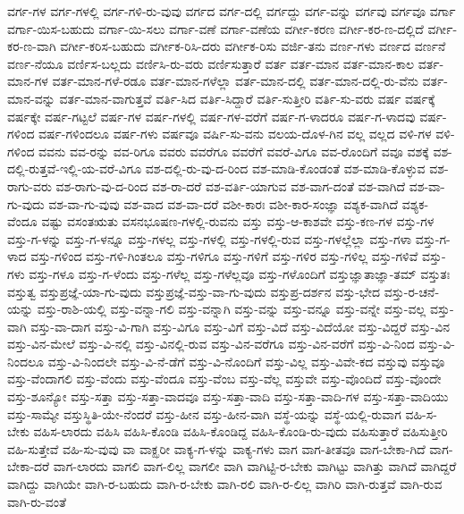 {ವರ್ಗ-ಗಳ
ವರ್ಗ-ಗಳಲ್ಲಿ
ವರ್ಗ-ಗಳಿ-ರು-ವುವು
ವರ್ಗದ
ವರ್ಗ-ದಲ್ಲಿ
ವರ್ಗದ್ದು
ವರ್ಗ-ವನ್ನು
ವರ್ಗವು
ವರ್ಗವೂ
ವರ್ಗಾ
ವರ್ಗಾ-ಯಿಸ-ಬಹುದು
ವರ್ಗಾ-ಯಿ-ಸಲು
ವರ್ಗಾ-ವಣೆ
ವರ್ಗಾ-ವಣೆಯ
ವರ್ಗೀ-ಕರಣ
ವರ್ಗೀ-ಕರ-ಣ-ದಲ್ಲಿದೆ
ವರ್ಗೀ-ಕರ-ಣ-ವಾಗಿ
ವರ್ಗೀ-ಕರಿಸ-ಬಹುದು
ವರ್ಗೀಕ-ರಿಸಿ-ದರು
ವರ್ಗೀಕ-ರಿಸು
ವರ್ಜಿ-ತನು
ವರ್ಣ-ಗಳು
ವರ್ಣದ
ವರ್ಣನೆ
ವರ್ಣ-ನೆಯೂ
ವರ್ಣಿಸ-ಬಲ್ಲದು
ವರ್ಣಿಸಿ-ರು-ವರು
ವರ್ಣಿಸುತ್ತಾರೆ
ವರ್ತ
ವರ್ತ-ಮಾನ
ವರ್ತ-ಮಾನ-ಕಾಲ
ವರ್ತ-ಮಾನ-ಗಳ
ವರ್ತ-ಮಾನ-ಗಳೆ-ರಡೂ
ವರ್ತ-ಮಾನ-ಗಳೆಲ್ಲಾ
ವರ್ತ-ಮಾನ-ದಲ್ಲಿ
ವರ್ತ-ಮಾನ-ದಲ್ಲಿ-ರು-ವೆನು
ವರ್ತ-ಮಾನ-ವನ್ನು
ವರ್ತ-ಮಾನ-ವಾಗುತ್ತವೆ
ವರ್ತಿ-ಸಿದ
ವರ್ತಿ-ಸಿದ್ದಾರೆ
ವರ್ತಿ-ಸುತ್ತೀರಿ
ವರ್ತಿ-ಸು-ವರು
ವರ್ಷ
ವರ್ಷಕ್ಕೆ
ವರ್ಷಕ್ಕೇ
ವರ್ಷ-ಗಟ್ಟಲೆ
ವರ್ಷ-ಗಳ
ವರ್ಷ-ಗಳಲ್ಲಿ
ವರ್ಷ-ಗಳ-ವರೆಗೆ
ವರ್ಷ-ಗ-ಳಾದರೂ
ವರ್ಷ-ಗ-ಳಾದವು
ವರ್ಷ-ಗಳಿಂದ
ವರ್ಷ-ಗಳಿಂದಲೂ
ವರ್ಷ-ಗಳು
ವರ್ಷವೂ
ವರ್ಷಿ-ಸು-ವನು
ವಲಯ-ದೊಳ-ಗಿನ
ವಲ್ಲ
ವಲ್ಲದ
ವಳಿ-ಗಳ
ವಳಿ-ಗಳಿಂದ
ವವನು
ವವ-ರನ್ನು
ವವ-ರಿಗೂ
ವವರು
ವವರೆಗೂ
ವವರೆಗೆ
ವವರೆ-ವಿಗೂ
ವವ-ರೊಂದಿಗೆ
ವವೂ
ವಶಕ್ಕೆ
ವಶ-ದಲ್ಲಿ-ರುತ್ತವೆ-ಇಲ್ಲಿ-ಯ-ವರೆ-ವಿಗೂ
ವಶ-ದಲ್ಲಿ-ರು-ವು-ದ-ರಿಂದ
ವಶ-ಮಾಡಿ-ಕೊಂಡಂತೆ
ವಶ-ಮಾಡಿ-ಕೊಳ್ಳುವ
ವಶ-ರಾಗು-ವರು
ವಶ-ರಾಗು-ವು-ದ-ರಿಂದ
ವಶ-ರಾ-ದರೆ
ವಶ-ವರ್ತಿ-ಯಾಗುವ
ವಶ-ವಾಗ-ದಂತೆ
ವಶ-ವಾಗಿದೆ
ವಶ-ವಾ-ಗು-ವುದು
ವಶ-ವಾ-ಗು-ವುವು
ವಶ-ವಾದ
ವಶ-ವಾ-ದರೆ
ವಶೀ-ಕಾರಃ
ವಶೀ-ಕಾರ-ಸಂಜ್ಞಾ
ವಶ್ಯಕ-ವಾಗಿದೆ
ವಶ್ಯಕ-ವೆಂದೂ
ವಷ್ಟು
ವಸಂತಋತು
ವಸನಭೂಷಣ-ಗಳಲ್ಲಿ-ರುವನು
ವಸ್ತು
ವಸ್ತು-ಆ-ಕಾಶವೇ
ವಸ್ತು-ಕಣ-ಗಳ
ವಸ್ತು-ಗಳ
ವಸ್ತು-ಗ-ಳನ್ನು
ವಸ್ತು-ಗ-ಳನ್ನೂ
ವಸ್ತು-ಗಳಲ್ಲ
ವಸ್ತು-ಗಳಲ್ಲಿ
ವಸ್ತು-ಗಳಲ್ಲಿ-ರುವ
ವಸ್ತು-ಗಳಲ್ಲೆಲ್ಲಾ
ವಸ್ತು-ಗಳಾ
ವಸ್ತು-ಗ-ಳಾದ
ವಸ್ತು-ಗಳಿಂದ
ವಸ್ತು-ಗಳಿ-ಗಿಂತಲೂ
ವಸ್ತು-ಗಳಿಗೂ
ವಸ್ತು-ಗಳಿಗೆ
ವಸ್ತು-ಗಳಿರ
ವಸ್ತು-ಗಳಿಲ್ಲ
ವಸ್ತು-ಗಳಿವೆ
ವಸ್ತು-ಗಳು
ವಸ್ತು-ಗಳೂ
ವಸ್ತು-ಗ-ಳೆಂದು
ವಸ್ತು-ಗಳೆಲ್ಲ
ವಸ್ತು-ಗಳೆಲ್ಲವೂ
ವಸ್ತು-ಗಳೊಂದಿಗೆ
ವಸ್ತುಜ್ಞಾತಾಜ್ಞಾ-ತಮ್
ವಸ್ತುತಃ
ವಸ್ತುತ್ವ
ವಸ್ತುಪ್ರಜ್ಞೆ-ಯಾ-ಗು-ವುದು
ವಸ್ತುಪ್ರಜ್ಞೆ-ವಸ್ತು-ವಾ-ಗು-ವುದು
ವಸ್ತುಪ್ರ-ದರ್ಶನ
ವಸ್ತು-ಭೇದ
ವಸ್ತು-ರ-ಚನೆ-ಯನ್ನು
ವಸ್ತು-ರಾಶಿ-ಯಲ್ಲಿ
ವಸ್ತು-ವನ್ನಾ-ಗಲಿ
ವಸ್ತು-ವನ್ನಾಗಿ
ವಸ್ತು-ವನ್ನು
ವಸ್ತು-ವನ್ನೂ
ವಸ್ತು-ವನ್ನೇ
ವಸ್ತು-ವಲ್ಲ
ವಸ್ತು-ವಾಗಿ
ವಸ್ತು-ವಾ-ದಾಗ
ವಸ್ತು-ವಿ-ಗಾಗಿ
ವಸ್ತು-ವಿಗೂ
ವಸ್ತು-ವಿಗೆ
ವಸ್ತು-ವಿದೆ
ವಸ್ತು-ವಿದೆಯೋ
ವಸ್ತು-ವಿದ್ದರೆ
ವಸ್ತು-ವಿನ
ವಸ್ತು-ವಿನ-ಮೇಲೆ
ವಸ್ತು-ವಿ-ನಲ್ಲಿ
ವಸ್ತು-ವಿನಲ್ಲಿ-ರುವ
ವಸ್ತು-ವಿನ-ವರೆಗೂ
ವಸ್ತು-ವಿನ-ವರೆಗೆ
ವಸ್ತು-ವಿ-ನಿಂದ
ವಸ್ತು-ವಿ-ನಿಂದಲೂ
ವಸ್ತು-ವಿ-ನಿಂದಲೇ
ವಸ್ತು-ವಿ-ನೆ-ಡೆಗೆ
ವಸ್ತು-ವಿ-ನೊಂದಿಗೆ
ವಸ್ತು-ವಿಲ್ಲ
ವಸ್ತು-ವಿವೇ-ಕದ
ವಸ್ತುವು
ವಸ್ತುವೂ
ವಸ್ತು-ವೆಂದಾಗಲಿ
ವಸ್ತು-ವೆಂದು
ವಸ್ತು-ವೆಂದೂ
ವಸ್ತು-ವೆಂಬ
ವಸ್ತು-ವೆಲ್ಲ
ವಸ್ತುವೇ
ವಸ್ತು-ವೊಂದಿದೆ
ವಸ್ತು-ವೊಂದೇ
ವಸ್ತು-ಶೂನ್ಯೋ
ವಸ್ತು-ಸತ್ತಾ
ವಸ್ತು-ಸತ್ತಾ-ವಾದವೂ
ವಸ್ತು-ಸತ್ತಾ-ವಾದಿ
ವಸ್ತು-ಸತ್ತಾ-ವಾದಿ-ಗಳ
ವಸ್ತು-ಸತ್ತಾ-ವಾದಿಯು
ವಸ್ತು-ಸಾಮ್ಯೇ
ವಸ್ತುಸ್ಥಿತಿ-ಯೇ-ನೆಂದರೆ
ವಸ್ತು-ಹೀನ
ವಸ್ತು-ಹೀನ-ವಾಗಿ
ವಸ್ಥೆ-ಯನ್ನು
ವಸ್ಥೆ-ಯಲ್ಲಿ-ರುವಾಗ
ವಹಿ-ಸ-ಬೇಕು
ವಹಿಸ-ಲಾರದು
ವಹಿಸಿ
ವಹಿಸಿ-ಕೊಂಡಿ
ವಹಿಸಿ-ಕೊಂಡಿದ್ದ
ವಹಿಸಿ-ಕೊಂಡಿ-ರು-ವುದು
ವಹಿಸುತ್ತಾರೆ
ವಹಿಸುತ್ತೀರಿ
ವಹಿ-ಸುತ್ತೇವೆ
ವಹಿ-ಸು-ವುವು
ವಾ
ವಾಕ್ಝರೀ
ವಾಕ್ಯ-ಗ-ಳನ್ನು
ವಾಕ್ಯ-ಗಳು
ವಾಗ
ವಾಗ-ತೀತವೂ
ವಾಗ-ಬೇಕಾ-ಗಿದೆ
ವಾಗ-ಬೇಕಾ-ದರೆ
ವಾಗ-ಲಾರದು
ವಾಗಲಿ
ವಾಗ-ಲಿಲ್ಲ
ವಾಗಲೀ
ವಾಗಿ
ವಾಗಿಟ್ಟಿ-ರ-ಬೇಕು
ವಾಗಿಟ್ಟು
ವಾಗಿತ್ತು
ವಾಗಿದೆ
ವಾಗಿದ್ದರೆ
ವಾಗಿದ್ದು
ವಾಗಿಯೇ
ವಾಗಿ-ರ-ಬಹುದು
ವಾಗಿ-ರ-ಬೇಕು
ವಾಗಿ-ರಲಿ
ವಾಗಿ-ರ-ಲಿಲ್ಲ
ವಾಗಿರಿ
ವಾಗಿ-ರುತ್ತವೆ
ವಾಗಿ-ರುವ
ವಾಗಿ-ರು-ವಂತೆ
}
